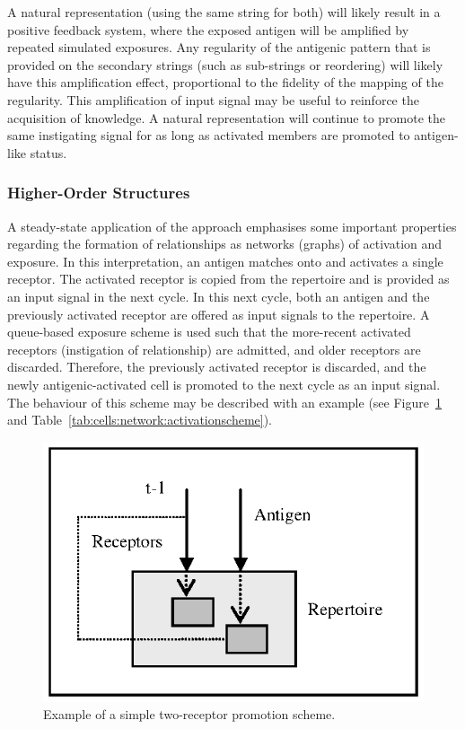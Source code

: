 A natural representation (using the same string for both) will likely result in a positive feedback system, where the exposed antigen will be amplified by repeated simulated exposures. Any regularity of the antigenic pattern that is provided on the secondary strings (such as sub-strings or reordering) will likely have this amplification effect, proportional to the fidelity of the mapping of the regularity. This amplification of input signal may be useful to reinforce the acquisition of knowledge. A natural representation will continue to promote the same instigating signal for as long as activated members are promoted to antigen-like status.

%
%
\subsubsection{Higher-Order Structures}
A steady-state application of the approach emphasises some important properties regarding the formation of relationships as networks (graphs) of activation and exposure. In this interpretation, an antigen matches onto and activates a single receptor. The activated receptor is copied from the repertoire and is provided as an input signal in the next cycle. In this next cycle, both an antigen and the previously activated receptor are offered as input signals to the repertoire. A queue-based exposure scheme is used such that the more-recent activated receptors (instigation of relationship) are admitted, and older receptors are discarded. Therefore, the previously activated receptor is discarded, and the newly antigenic-activated cell is promoted to the next cycle as an input signal. The behaviour of this scheme may be described with an example (see Figure~\ref{pic:cells:network:recurrent} and Table~\ref{tab:cells:network:activationscheme}).

\begin{figure}[ht]
	\centering
	\includegraphics[scale=0.85]{Cells/network-structures-feedback}
	\caption{Example of a simple two-receptor promotion scheme.}
	\label{pic:cells:network:recurrent}
\end{figure}

